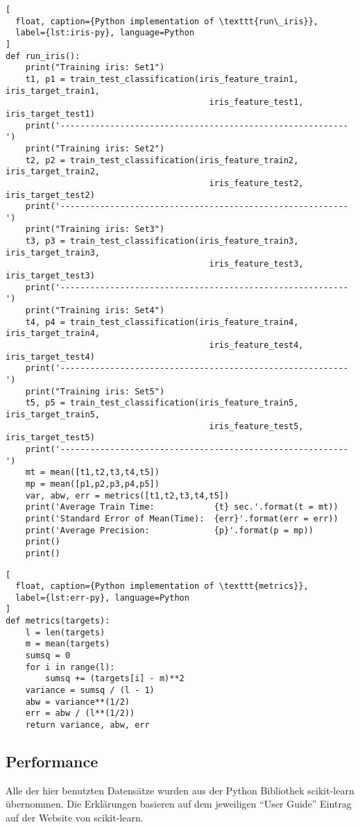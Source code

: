 \begin{lstlisting}[
  float, caption={Python implementation of \texttt{run\_iris}},
  label={lst:iris-py}, language=Python
]
def run_iris():
    print("Training iris: Set1")
    t1, p1 = train_test_classification(iris_feature_train1, iris_target_train1,
                                         iris_feature_test1, iris_target_test1)
    print('----------------------------------------------------------')
    print("Training iris: Set2")
    t2, p2 = train_test_classification(iris_feature_train2, iris_target_train2,
                                         iris_feature_test2, iris_target_test2)
    print('----------------------------------------------------------')
    print("Training iris: Set3")
    t3, p3 = train_test_classification(iris_feature_train3, iris_target_train3,
                                         iris_feature_test3, iris_target_test3)
    print('----------------------------------------------------------')
    print("Training iris: Set4")
    t4, p4 = train_test_classification(iris_feature_train4, iris_target_train4,
                                         iris_feature_test4, iris_target_test4)
    print('----------------------------------------------------------')
    print("Training iris: Set5")
    t5, p5 = train_test_classification(iris_feature_train5, iris_target_train5,
                                         iris_feature_test5, iris_target_test5)
    print('----------------------------------------------------------')
    mt = mean([t1,t2,t3,t4,t5])
    mp = mean([p1,p2,p3,p4,p5])
    var, abw, err = metrics([t1,t2,t3,t4,t5])
    print('Average Train Time:            {t} sec.'.format(t = mt))
    print('Standard Error of Mean(Time):  {err}'.format(err = err))
    print('Average Precision:             {p}'.format(p = mp))
    print()
    print()
\end{lstlisting}
\begin{lstlisting}[
  float, caption={Python implementation of \texttt{metrics}},
  label={lst:err-py}, language=Python
]
def metrics(targets):
    l = len(targets)
    m = mean(targets)
    sumsq = 0
    for i in range(l):
        sumsq += (targets[i] - m)**2
    variance = sumsq / (l - 1)
    abw = variance**(1/2)
    err = abw / (l**(1/2))
    return variance, abw, err
\end{lstlisting}


\subsection{Performance} \label{sec:Performance}
Alle der hier benutzten Datensätze wurden aus der Python Bibliothek scikit-learn
übernommen. Die Erklärungen basieren auf dem jeweiligen \enquote{User Guide} Eintrag auf der Website von scikit-learn.

